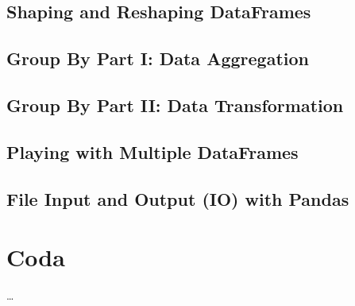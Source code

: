 \documentclass[a4paper,11pt]{book}
\numberwithin{figure}{chapter}
\numberwithin{table}{chapter}
\begin{document}
\section{Shaping and Reshaping DataFrames}


\section{Group By Part I: Data Aggregation}


\section{Group By Part II: Data Transformation}


\section{Playing with Multiple DataFrames}



\section{File Input and Output (IO) with Pandas}
\label{sec:pandas_io}

\theendnotes

\chapter{Coda}
\ldots

\clearpage
\end{document}
